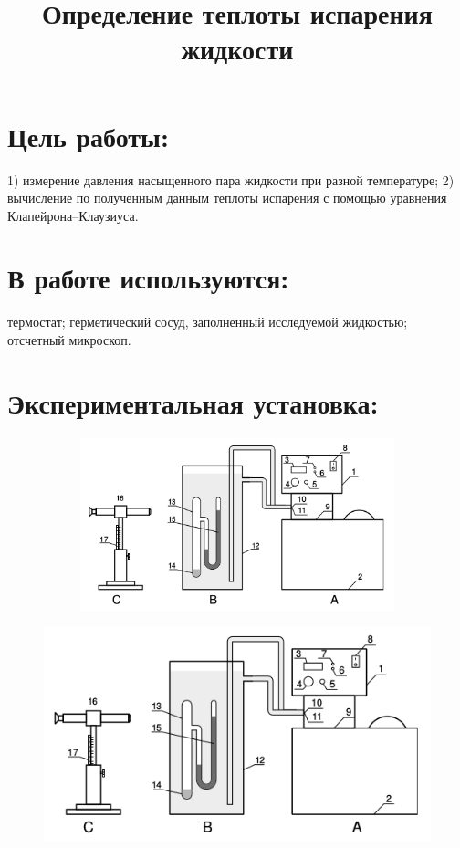 \documentclass[20pt]{article}
\author{}
\title{Определение теплоты испарения жидкости}
\date{}
\begin{document}
\parindent=1cm
\large
\maketitle
\section{Цель работы:}
1) измерение давления насыщенного пара жидкости при разной температуре;
2) вычисление по полученным данным теплоты испарения с помощью уравнения Клапейрона–Клаузиуса.
\section{В работе используются:}
термостат; герметический сосуд, заполненный исследуемой жидкостью; отсчетный микроскоп.
\section{Экспериментальная установка:}
\begin{figure}[H]\begin{figure}[H]
\center
\includegraphics[scale=0.5]{asd.png}
\end{figure}
\center
\includegraphics[scale=0.5]{asd.png}
\end{figure}
\end{document}

